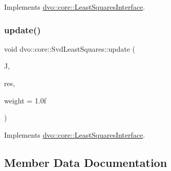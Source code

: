 Implements \mbox{\hyperlink{classdvo_1_1core_1_1_least_squares_interface_a3e2b3c894c5286fdee79316e6fa4d691}{dvo\+::core\+::\+Least\+Squares\+Interface}}.

\mbox{\label{classdvo_1_1core_1_1_svd_least_squares_ae9d28bc58804d7e43cf461ca092b9563}} 
\subsubsection{\texorpdfstring{update()}{update()}}
{\footnotesize\ttfamily void dvo\+::core\+::\+Svd\+Least\+Squares\+::update (\begin{DoxyParamCaption}\item[{const \mbox{\hyperlink{namespacedvo_1_1core_a05327f3312d32a301bce9fccda9e5807}{Vector6}} \&}]{J,  }\item[{const \mbox{\hyperlink{namespacedvo_1_1core_ab9c199d221775a923e2549ad7e15c323}{Num\+Type}} \&}]{res,  }\item[{const \mbox{\hyperlink{namespacedvo_1_1core_ab9c199d221775a923e2549ad7e15c323}{Num\+Type}} \&}]{weight = {\ttfamily 1.0f} }\end{DoxyParamCaption})\hspace{0.3cm}{\ttfamily [virtual]}}



Implements \mbox{\hyperlink{classdvo_1_1core_1_1_least_squares_interface_a5f5cc1c312a01ff4e7ca91e90a73ccf3}{dvo\+::core\+::\+Least\+Squares\+Interface}}.



\subsection{Member Data Documentation}
\mbox{\label{classdvo_1_1core_1_1_svd_least_squares_a437352a5c072b985547c122d22850da6}} 
